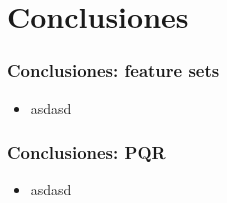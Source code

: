 
\section{Conclusiones}

\begin{frame}
\frametitle{Conclusiones: feature sets}
\begin{itemize}
\item asdasd
\end{itemize}
\end{frame}

\begin{frame}
\frametitle{Conclusiones: PQR}
\begin{itemize}
\item asdasd
\end{itemize}
\end{frame}
